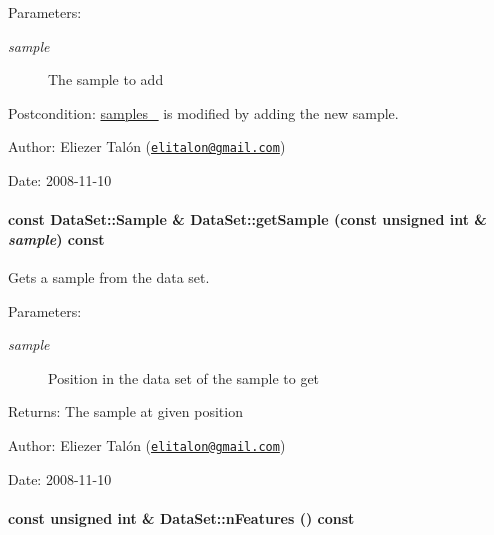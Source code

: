 \begin{Desc}
\item[Parameters:]
\begin{description}
\item[{\em sample}]The sample to add\end{description}
\end{Desc}
\begin{Desc}
\item[Postcondition:]\hyperlink{class_data_set_cfb8c9d22aa3d295e37ef7d820c9c33e}{samples\_\-} is modified by adding the new sample.\end{Desc}
\begin{Desc}
\item[Author:]Eliezer Talón (\href{mailto:elitalon@gmail.com}{\tt elitalon@gmail.com}) \end{Desc}
\begin{Desc}
\item[Date:]2008-11-10 \end{Desc}
\hypertarget{class_data_set_73dcd4309ecf1dbc2bcb0ba861077ac5}{
\paragraph[{getSample}]{\setlength{\rightskip}{0pt plus 5cm}const {\bf DataSet::Sample} \& DataSet::getSample (const unsigned int \& {\em sample}) const}\hfill}
\label{class_data_set_73dcd4309ecf1dbc2bcb0ba861077ac5}


Gets a sample from the data set. 

\begin{Desc}
\item[Parameters:]
\begin{description}
\item[{\em sample}]Position in the data set of the sample to get\end{description}
\end{Desc}
\begin{Desc}
\item[Returns:]The sample at given position\end{Desc}
\begin{Desc}
\item[Author:]Eliezer Talón (\href{mailto:elitalon@gmail.com}{\tt elitalon@gmail.com}) \end{Desc}
\begin{Desc}
\item[Date:]2008-11-10 \end{Desc}
\hypertarget{class_data_set_a4249f02ed870b2e76f0e73728229be2}{
\paragraph[{nFeatures}]{\setlength{\rightskip}{0pt plus 5cm}const unsigned int \& DataSet::nFeatures () const}\hfill}
\label{class_data_set_a4249f02ed870b2e76f0e73728229be2}



